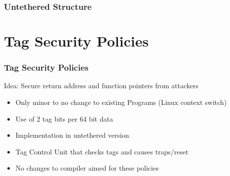 \documentclass{beamer}
\begin{document}
\begin{frame}
	\frametitle{Untethered Structure}
	\begin{figure}[!h]
	\begin{center}
	\end{center}
	\end{figure}
\end{frame}

\section{Tag Security Policies}

\begin{frame}
	\frametitle{Tag Security Policies}
   Idea: Secure return address and function pointers from attackers
   \begin{itemize}
	   \item Only minor to no change to existing Programs (Linux context switch)
 	  \item Use of 2 tag bits per 64 bit data %
 	  \item Implementation in untethered version
 	  \item Tag Control Unit that checks tags and causes traps/reset   
 	  \item No changes to compiler aimed for these policies
   \end{itemize}
\end{frame}
\end{document}
